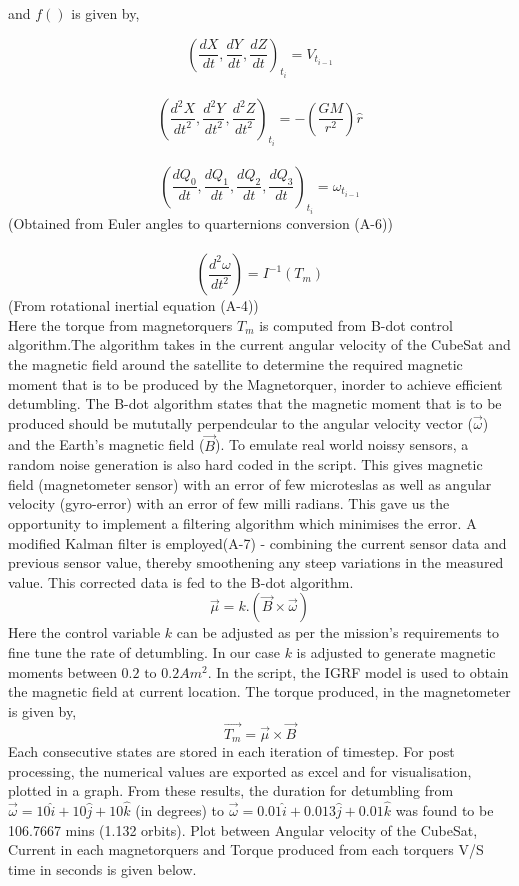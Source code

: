 \documentclass[11pt]{report}
\begin{document}
	\noindent and $f()$ is given by,
	
	$$\left(\frac{dX}{dt},\frac{dY}{dt},\frac{dZ}{dt}\right)_{t_i} = V_{t_{i-1}}$$\\
	$$\left(\frac{d^2X}{dt^2},\frac{d^2Y}{dt^2},\frac{d^2Z}{dt^2}\right)_{t_i} = -\left(\frac{GM}{r^2}\right)\hat{r}$$\\
	$$\left(\frac{dQ_0}{dt},\frac{dQ_1}{dt},\frac{dQ_2}{dt},\frac{dQ_3}{dt}\right)_{t_i} = \omega_{t_{i-1}}$$
	\hspace{35pt} (Obtained from Euler angles to quarternions conversion (A-6))\\\\
	\pagebreak
	$$\left(\frac{d^2\omega}{dt^2}\right) = I^{-1}(T_m)$$
	\hspace{100pt} (From rotational inertial equation (A-4))\\
	
	Here the torque from magnetorquers $T_m$ is computed from B-dot control algorithm.The algorithm takes in the current angular velocity of the CubeSat and the magnetic field around the satellite to determine the required magnetic moment that is to be produced by the Magnetorquer, inorder to achieve efficient detumbling. The B-dot algorithm states that the magnetic moment that is to be produced should be mututally perpendcular to the angular velocity vector ($\vec{\omega}$) and the Earth's magnetic field ($\vec{B}$). To emulate real world noissy sensors, a random noise generation is also hard coded in the script. This gives magnetic field (magnetometer sensor) with an error of few microteslas as well as angular velocity (gyro-error)  with an error of few milli radians. This gave us the opportunity to implement a filtering algorithm which minimises the error. A modified Kalman filter is employed(A-7) - combining the current sensor data and previous sensor value, thereby smoothening any steep variations in the measured value. This corrected data is fed to the B-dot algorithm.
	$$\vec{\mu} = k.\left(\vec{B}\times\vec{\omega}\right)$$
	Here the control variable $k$ can be adjusted as per the mission's requirements to fine tune the rate of detumbling. In our case $k$ is adjusted to generate magnetic moments between $0.2\text{ to }0.2Am^2$. In the script, the IGRF model is used to obtain the magnetic field at current location. The torque produced, in the magnetometer is given by, 	
	$$\vec{T_m} = \vec{\mu}\times\vec{B}$$
	Each consecutive states are stored in each iteration of timestep. For post processing, the numerical values are exported as excel and for visualisation, plotted in a graph. From these results, the duration for detumbling from $\vec{\omega}=10\hat{i}+10\hat{j}+10\hat{k}$ (in degrees) to $\vec{\omega}=0.01\hat{i}+0.013\hat{j}+0.01\hat{k}$ was found to be 106.7667 mins (1.132 orbits). Plot between Angular velocity of the CubeSat, Current in each magnetorquers and Torque produced from each torquers V/S time in seconds is given below. 
	\pagebreak
	
\end{document}
